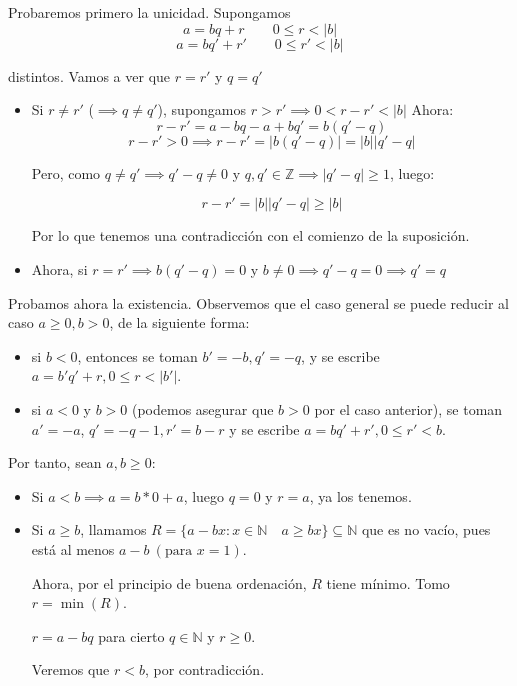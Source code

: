 \documentclass[11pt, a4paper, titlepage]{article}
\makeatletter
\newif\IfInSansMode
\let\oldsf\sffamily
\renewcommand*{\sffamily}{\oldsf\mathversion{sans}\InSansModetrue}
\let\oldnorm\normalfont
\renewcommand*{\normalfont}{\oldnorm\InSansModefalse\mathversion{normal}}
\renewenvironment{proof}[1][\proofname] {\vspace{-15pt}\par\pushQED{\qed}\normalfont\topsep6\p@\@plus6\p@\relax\trivlist\item[\hskip\labelsep\it#1\@addpunct{.}]\ignorespaces}{\popQED\endtrivlist\@endpefalse}
\providecommand{\ent}{\mathbb{Z}}
\providecommand{\nat}{\mathbb{N}}
\providecommand{\abs}[1]{\lvert#1\rvert}
\renewenvironment{proof}[1][\proofname] {\par\pushQED{\qed}\normalfont\topsep6\p@\@plus6\p@\relax\trivlist\item[\hskip\labelsep\itshape\sffamily#1\@addpunct{.}]\ignorespaces}{\popQED\endtrivlist\@endpefalse}
\theoremstyle{theorem-style}
\theoremstyle{definition-style}
\theoremstyle{remark-style}
\theoremstyle{example-style}
\makeatother
\begin{document}
\begin{proof}
Probaremos primero la unicidad. Supongamos
$$a=bq+r \quad \quad 0\leq r <\abs{b}$$
$$a=bq'+r' \quad \quad 0 \leq r' < \abs{b}$$

distintos. Vamos a ver que $r=r'$ y $q=q'$

\begin{itemize}
	\item Si $r \neq r'$ ($\implies q\ne q'$), supongamos $r > r' \implies 0 < r - r' < \abs{b}$
Ahora:
$$ r-r' = a-bq - a +bq' = b(q' -q )$$
$$r-r' > 0 \implies r - r' = \abs{b(q' -q)} = \abs{b}\abs{q' -q}$$

Pero, como $q\neq q' \implies q'-q \neq 0$ y $q,q' \in \ent \implies \abs{q' -q} \geq 1 $, luego:

$$ r-r' = \abs{b}\abs{q' -q} \geq \abs{b}$$

Por lo que tenemos una contradicción con el comienzo de la suposición.

	\item Ahora, si $r=r'\implies b(q' -q) = 0$ y $b\neq 0 \implies q' -q=0 \implies q' =q$
\end{itemize}

Probamos ahora la existencia. Observemos que el caso general se puede reducir al caso $a \ge 0, b > 0$, de la
siguiente forma:

\begin{itemize}
\item si $b<0$, entonces se toman $b' = -b, q' = -q$, y se escribe $a = b'q' +r, 0 \le r < |b'|$.
\item si $a<0$ y $b>0$ (podemos asegurar que $b>0$ por el caso anterior), se toman $a' = -a$, $q' = -q -1, r' = b-r$
  y se escribe $a = bq'+r', 0 \le r' < b$.
\end{itemize}

Por tanto, sean $a,b \geq 0$:

\begin{itemize}
	\item Si $ a < b \implies a = b*0 + a$, luego $q=0$ y $r=a$, ya los tenemos.
	\item Si $a \geq b$, llamamos $R=\{a-bx: x\in \nat \quad a \geq bx\}\subseteq \nat$ que es no vacío, pues está al menos $ a-b \ (\text{para } x=1)$.

	Ahora, por el principio de buena ordenación, $R$ tiene mínimo. Tomo $r=\min(R)$.

$r=a-bq$ para cierto $q \in \nat$ y $ r \geq 0$.

Veremos que $r < b$, por contradicción.


\end{itemize}
\end{proof}
\end{document}
